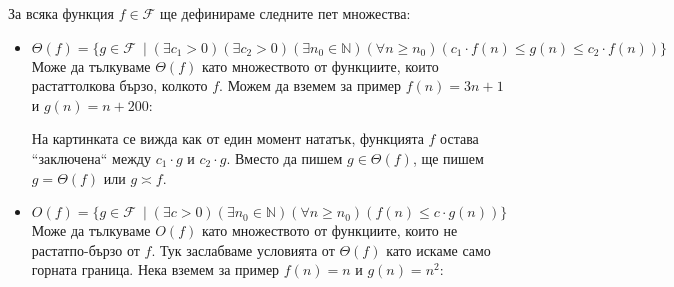 \documentclass{article}
\newcommand{\N}{\mathbb{N}}
\newcommand{\F}{\mathcal{F}}
\theoremstyle{definition}
\theoremstyle{plain}
\theoremstyle{remark}
\theoremstyle{definition}
\begin{document}
За всяка функция $f \in \F$ ще дефинираме следните пет множества:
\begin{itemize}
  \item $\Theta(f) = \{ g \in \F \: \mid (\exists c_1 > 0)(\exists c_2 > 0)(\exists n_0 \in \N)(\forall n \geq n_0)(c_1 \cdot f(n) \leq g(n) \leq c_2 \cdot f(n))\}$ \\
        Може да тълкуваме $\Theta(f)$ като множеството от функциите, които растат\footnotemark[1] толкова бързо, колкото $f$.
        Можем да вземем за пример $f(n) = 3n + 1$ и $g(n) = n + 200$:


        На картинката се вижда как от един момент нататък, функцията $f$ остава ``заключена`` между $c_1 \cdot g$ и $c_2 \cdot g$.
        Вместо да пишем $g \in \Theta(f)$, ще пишем $g = \Theta(f)$ или $g \asymp f$.
  \item $O(f) = \{ g \in \F \: \mid (\exists c > 0)(\exists n_0 \in \N)(\forall n \geq n_0)(f(n) \leq c \cdot g(n))\}$ \\
        Може да тълкуваме $O(f)$ като множеството от функциите, които не растат\footnotemark[1] по-бързо от $f$.
        Тук заслабваме условията от $\Theta(f)$ като искаме само горната граница.
        Нека вземем за пример $f(n) = n$ и $g(n) = n^2$:



\end{itemize}
\end{document}
